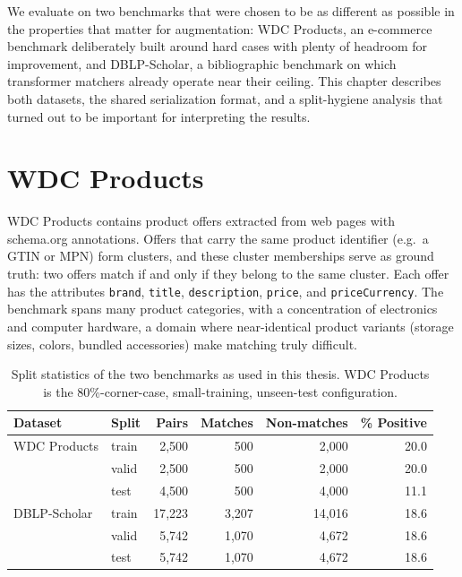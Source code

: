 \documentclass[a4paper,oneside,bibliography=totoc]{scrbook}
\begin{document}
We evaluate on two benchmarks that were chosen to be as different as possible in the properties that matter for augmentation: WDC Products, an e-commerce benchmark deliberately built around hard cases with plenty of headroom for improvement, and DBLP-Scholar, a bibliographic benchmark on which transformer matchers already operate near their ceiling. This chapter describes both datasets, the shared serialization format, and a split-hygiene analysis that turned out to be important for interpreting the results.

\section{WDC Products}
\label{sec:data_wdc}

WDC Products \cite{peeters2024wdc} contains product offers extracted from web pages with schema.org annotations. Offers that carry the same product identifier (e.g.\ a GTIN or MPN) form clusters, and these cluster memberships serve as ground truth: two offers match if and only if they belong to the same cluster. Each offer has the attributes \texttt{brand}, \texttt{title}, \texttt{description}, \texttt{price}, and \texttt{priceCurrency}. The benchmark spans many product categories, with a concentration of electronics and computer hardware, a domain where near-identical product variants (storage sizes, colors, bundled accessories) make matching truly difficult.

\begin{table}[!htbp]
  \centering
  \begin{tabular}{llrrrr}
    \toprule
    \textbf{Dataset} & \textbf{Split} & \textbf{Pairs} & \textbf{Matches} & \textbf{Non-matches} & \textbf{\% Positive} \\
    \midrule
    WDC Products & train & 2{,}500 & 500 & 2{,}000 & 20.0 \\
                 & valid & 2{,}500 & 500 & 2{,}000 & 20.0 \\
                 & test  & 4{,}500 & 500 & 4{,}000 & 11.1 \\
    \midrule
    DBLP-Scholar & train & 17{,}223 & 3{,}207 & 14{,}016 & 18.6 \\
                 & valid & 5{,}742 & 1{,}070 & 4{,}672 & 18.6 \\
                 & test  & 5{,}742 & 1{,}070 & 4{,}672 & 18.6 \\
    \bottomrule
  \end{tabular}
  \caption{Split statistics of the two benchmarks as used in this thesis. WDC Products is the 80\%-corner-case, small-training, unseen-test configuration.}
  \label{tab:datasets}
\end{table}
\end{document}

